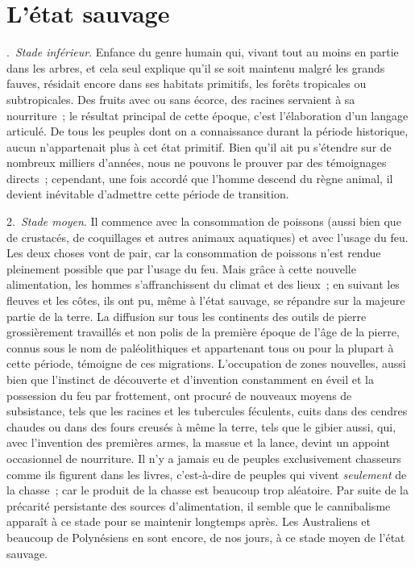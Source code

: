 \documentclass[french,twoside]{book} %
\begin{document}
\section[L’état sauvage]{L’état sauvage\protect\footnotemark }\renewcommand{\leftmark}{L’état sauvage}

. \emph{Stade inférieur}. Enfance du genre humain qui, vivant tout au moins en partie dans les arbres, et cela seul explique qu’il se soit maintenu malgré les grands fauves, résidait encore dans ses habitats primitifs, les forêts tropicales ou subtropicales. Des fruits avec ou sans écorce, des racines servaient à sa nourriture ; le résultat principal de cette époque, c’est l’élaboration d’un langage articulé. De tous les peuples dont on a connaissance durant la période historique, aucun n’appartenait plus à cet état primitif. Bien qu’il ait pu s’étendre sur de nombreux milliers d’années, nous ne pouvons le prouver par des témoignages directs ; cependant, une fois accordé que l’homme descend du règne animal, il devient inévitable d’admettre cette période de transition.\par
2. \emph{Stade moyen}. Il commence avec la consommation de poissons (aussi bien que de crustacés, de coquillages et autres animaux aquatiques) et avec l’usage du feu. Les deux choses vont de pair, car la consommation de poissons n’est rendue pleinement possible que par l’usage du feu. Mais grâce à cette nouvelle alimentation, les hommes s’affranchissent du climat et des lieux ; en suivant les fleuves et les côtes, ils ont pu, même à l’état sauvage, se répandre sur la majeure partie de la terre. La diffusion sur tous les continents des outils de pierre grossièrement travaillés et non polis de la première époque de l’âge de la pierre, connus sous le nom de paléolithiques et appartenant tous ou pour la plupart à cette période, témoigne de ces migrations. L’occupation de zones nouvelles, aussi bien que l’instinct de découverte et d’invention constamment en éveil et la possession du feu par frottement, ont procuré de nouveaux moyens de subsistance, tels que les racines et les tubercules féculents, cuits dans des cendres chaudes ou dans des fours creusés à même la terre, tels que le gibier aussi, qui, avec l’invention des premières armes, la massue et la lance, devint un appoint occasionnel de nourriture. Il n’y a jamais eu de peuples exclusivement chasseurs comme ils figurent dans les livres, c’est-à-dire de peuples qui vivent \emph{seulement} de la chasse ; car le produit de la chasse est beaucoup trop aléatoire. Par suite de la précarité persistante des sources d’alimentation, il semble que le cannibalisme apparaît à ce stade pour se maintenir longtemps après. Les Australiens et beaucoup de Polynésiens en sont encore, de nos jours, à ce stade moyen de l’état sauvage.\par
\end{document}
